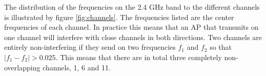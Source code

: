 	The distribution of the frequencies on the 2.4 GHz band to the different channels is illustrated by figure \ref{fig:channels}. The frequencies listed are the center frequencies of each channel. In practice this means that an AP that transmits on one channel will interfere with close channels in both directions. Two channels are entirely non-interfering if they send on two frequencies  $f_{1}$ and $f_{2}$ so that $|f_{1} - f_{2}| > 0.025$. This means that there are in total three completely non-overlapping channels, 1, 6 and 11.


